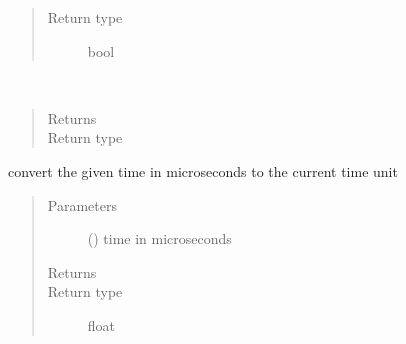 \documentclass[letterpaper,10pt,english]{sphinxmanual}
\begin{document}
\begin{fulllineitems}
\begin{fulllineitems}
\begin{quote}
\begin{description}
\item[{Return type}] \leavevmode
bool

\end{description}\end{quote}

\end{fulllineitems}


\begin{fulllineitems}
\label{\detokenize{Reference:salabim.Environment.main}}~\begin{quote}\begin{description}
\item[{Returns}] \leavevmode
{}

\item[{Return type}] \leavevmode
{\hyperref[\detokenize{Reference:salabim.Component}]{}}

\end{description}\end{quote}

\end{fulllineitems}


\begin{fulllineitems}
\label{\detokenize{Reference:salabim.Environment.microseconds}}
convert the given time in microseconds to the current time unit
\begin{quote}\begin{description}
\item[{Parameters}] \leavevmode
{} () \textendash{} time in microseconds

\item[{Returns}] \leavevmode
{}

\item[{Return type}] \leavevmode
float

\end{description}\end{quote}

\end{fulllineitems}



\end{fulllineitems}
\end{document}

